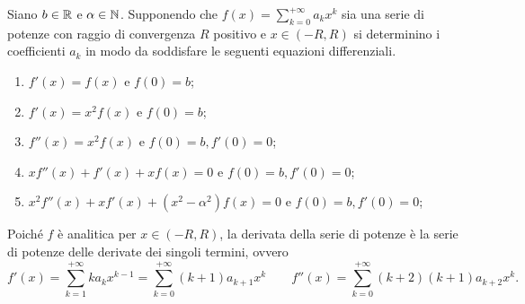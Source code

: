 \begin{es}
  Siano $ b \in \mathbb{R} $ e $ \alpha \in \mathbb{N} $. Supponendo che $ f(x) = \sum_{k = 0}^{+\infty} a_k x^k  $ sia una serie di potenze con raggio di convergenza $ R $ positivo e $ x \in (-R, R) $ si determinino i coefficienti $ a_k $ in modo da soddisfare le seguenti equazioni differenziali.
  \begin{enumerate}[label = (\roman*)]
  \item $ f'(x) = f(x) $ e $ f(0) = b $;
  \item $ f'(x) = x^2 f(x) $ e $ f(0) = b $;
  \item $ f''(x) = x^2 f(x) $ e $ f(0) = b, f'(0) = 0 $;
  \item $ x f''(x) + f'(x) + x f(x) = 0 $ e $ f(0) = b, f'(0) = 0 $;
  \item $ x^2 f''(x) + x f'(x) + (x^2 - \alpha^2) f(x) = 0 $ e $ f(0) = b, f'(0) = 0 $;
  \end{enumerate}
\end{es}
%
Poiché $ f $ è analitica per $ x \in (-R, R) $, la derivata della serie di potenze è la serie di potenze delle derivate dei singoli termini, ovvero \[f'(x) = \sum_{k = 1}^{+\infty} k a_k x^{k - 1} = \sum_{k = 0}^{+\infty} (k + 1) a_{k + 1} x^k \qquad f''(x) = \sum_{k = 0}^{+\infty} (k + 2)(k + 1) a_{k + 2} x^k.\]
